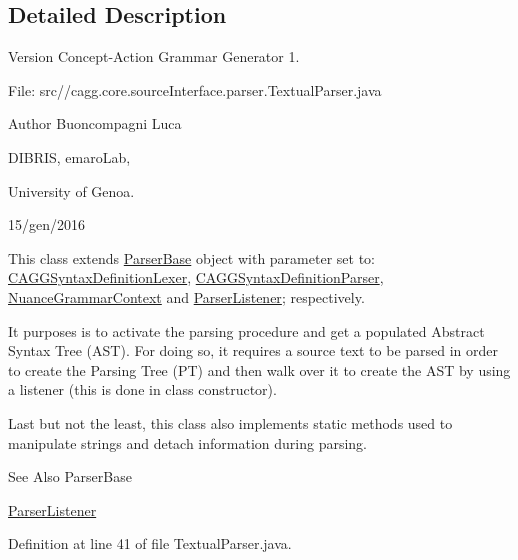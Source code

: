 \subsection{Detailed Description}
\begin{DoxyVersion}{Version}
Concept-\/\-Action Grammar Generator 1. \par
 File\-: src//cagg.core.\-source\-Interface.\-parser.\-Textual\-Parser.\-java \par

\end{DoxyVersion}
\begin{DoxyAuthor}{Author}
Buoncompagni Luca \par
 D\-I\-B\-R\-I\-S, emaro\-Lab,\par
 University of Genoa. \par
 15/gen/2016 \par

\end{DoxyAuthor}


This class extends \hyperlink{}{Parser\-Base} object with parameter set to\-: \hyperlink{}{C\-A\-G\-G\-Syntax\-Definition\-Lexer}, \hyperlink{}{C\-A\-G\-G\-Syntax\-Definition\-Parser}, \hyperlink{}{Nuance\-Grammar\-Context} and \hyperlink{classit_1_1emarolab_1_1cagg_1_1core_1_1language_1_1parser_1_1ParserListener}{Parser\-Listener}; respectively.\par


It purposes is to activate the parsing procedure and get a populated Abstract Syntax Tree (A\-S\-T). For doing so, it requires a source text to be parsed in order to create the Parsing Tree (P\-T) and then walk over it to create the A\-S\-T by using a listener (this is done in class constructor).\par


Last but not the least, this class also implements static methods used to manipulate strings and detach information during parsing. 

\begin{DoxySeeAlso}{See Also}
Parser\-Base 

\hyperlink{classit_1_1emarolab_1_1cagg_1_1core_1_1language_1_1parser_1_1ParserListener}{Parser\-Listener} 
\end{DoxySeeAlso}


Definition at line 41 of file Textual\-Parser.\-java.



